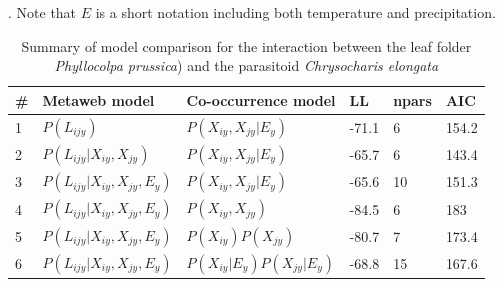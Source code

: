 \documentclass[12pt]{article}
\begin{document}
\newpage
\begin{landscape}
\begin{table}[]
\centering
\caption{Summary of model comparison for the interaction between the leaf
folder \textit{Phyllocolpa prussica}) and the parasitoid \textit{Chrysocharis
elongata}}. Note that $E$ is a short notation including both temperature and precipitation.
\begin{tabular}{llllll}
\hline
	\# & Metaweb model 						& Co-occurrence model 			& LL 	& npars & AIC \\ \hline
	1 & $P(L_{ijy})$ 						& $P(X_{iy},X_{jy}\lvert E_y)$ 		& -71.1 & 6 	& 154.2 \\
	2 & $P(L_{ijy} \lvert  X_{iy}, X_{jy})$ 		& $P(X_{iy},X_{jy}\lvert E_y)$ 		& -65.7 & 6 	& 143.4 \\
	3 & $P(L_{ijy} \lvert  X_{iy}, X_{jy}, E_y)$ & $P(X_{iy},X_{jy}\lvert E_y)$ 		& -65.6 & 10 	& 151.3 \\ \hline
	4 & $P(L_{ijy} \lvert  X_{iy}, X_{jy}, E_y)$ & $P(X_{iy},X_{jy})$ 			& -84.5 & 6 	& 183 \\
	5 & $P(L_{ijy} \lvert  X_{iy}, X_{jy}, E_y)$ & $P(X_{iy})P(X_{jy})$ 			& -80.7 & 7 	& 173.4 \\
	6 & $P(L_{ijy} \lvert  X_{iy}, X_{jy}, E_y)$ & $P(X_{iy}\lvert E_y)P(X_{jy}\lvert E_y)$ 	& -68.8 & 15 	& 167.6 \\
\hline
\end{tabular}
\end{table}
\end{landscape}

\newpage
\end{document}
